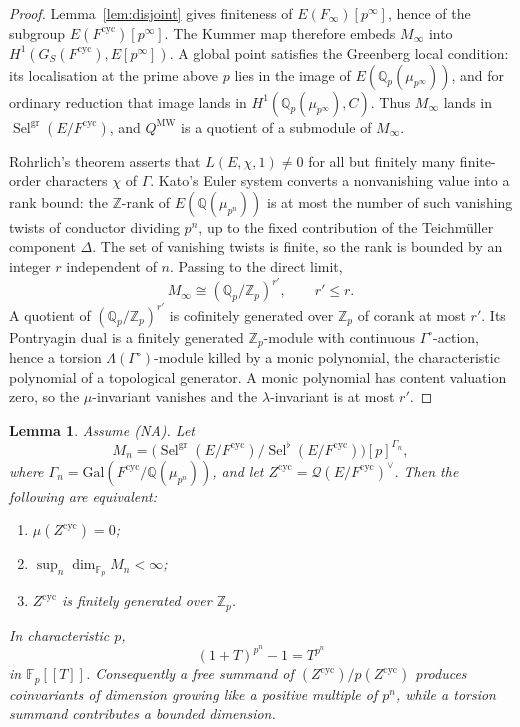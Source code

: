 \documentclass[11pt]{article}
\newtheorem{lemma}[theorem]{Lemma}
\theoremstyle{definition}
\theoremstyle{remark}
\newcommand{\Z}{\mathbb{Z}}
\newcommand{\Q}{\mathbb{Q}}
\newcommand{\F}{\mathbb{F}}
\newcommand{\Gal}{\mathrm{Gal}}
\newcommand{\Sel}{\operatorname{Sel}}
\newcommand{\cyc}{\mathrm{cyc}}
\newcommand{\gr}{\mathrm{gr}}
\newcommand{\flatp}{\flat}
\newcommand{\cQ}{\mathcal{Q}}
\newcommand{\Lam}{\Lambda}
\newcommand{\Gam}{\Gamma^{\circ}}
\begin{document}
\begin{proof}
Lemma~\ref{lem:disjoint} gives finiteness of \(E(F_\infty)[p^\infty]\), hence of the subgroup \(E(F^{\cyc})[p^\infty]\). The Kummer map therefore embeds \(M_\infty\) into \(H^1(G_S(F^{\cyc}),E[p^\infty])\). A global point satisfies the Greenberg local condition: its localisation at the prime above \(p\) lies in the image of \(E(\Q_p(\mu_{p^\infty}))\), and for ordinary reduction that image lands in \(H^1(\Q_p(\mu_{p^\infty}),C)\). Thus \(M_\infty\) lands in \(\Sel^{\gr}(E/F^{\cyc})\), and \(Q^{\mathrm{MW}}\) is a quotient of a submodule of \(M_\infty\).

Rohrlich's theorem asserts that \(L(E,\chi,1)\neq 0\) for all but finitely many finite-order characters \(\chi\) of \(\Gamma\). Kato's Euler system converts a nonvanishing value into a rank bound: the \(\Z\)-rank of \(E(\Q(\mu_{p^n}))\) is at most the number of such vanishing twists of conductor dividing \(p^n\), up to the fixed contribution of the Teichm\"uller component \(\Delta\). The set of vanishing twists is finite, so the rank is bounded by an integer \(r\) independent of \(n\). Passing to the direct limit,
\[
M_\infty\cong(\Q_p/\Z_p)^{r'},\qquad r'\le r.
\]
A quotient of \((\Q_p/\Z_p)^{r'}\) is cofinitely generated over \(\Z_p\) of corank at most \(r'\). Its Pontryagin dual is a finitely generated \(\Z_p\)-module with continuous \(\Gam\)-action, hence a torsion \(\Lam(\Gam)\)-module killed by a monic polynomial, the characteristic polynomial of a topological generator. A monic polynomial has content valuation zero, so the \(\mu\)-invariant vanishes and the \(\lambda\)-invariant is at most \(r'\).
\end{proof}

\begin{lemma}
\label{lem:residualgrowth}
Assume \textup{(NA)}. Let
\[
M_n
=
\bigl(\Sel^{\gr}(E/F^{\cyc})/\Sel^{\flatp}(E/F^{\cyc})\bigr)[p]^{\Gamma_n},
\]
where \(\Gamma_n=\Gal(F^{\cyc}/\Q(\mu_{p^n}))\), and let \(Z^{\cyc}=\cQ(E/F^{\cyc})^\vee\). Then the following are equivalent:
\begin{enumerate}[label=\textup{(\roman*)}]
\item \(\mu(Z^{\cyc})=0\);
\item \(\sup_n\dim_{\F_p} M_n<\infty\);
\item \(Z^{\cyc}\) is finitely generated over \(\Z_p\).
\end{enumerate}
In characteristic \(p\),
\begin{equation}
\label{eq:freshman}
(1+T)^{p^n}-1=T^{p^n}
\end{equation}
in \(\F_p[[T]]\). Consequently a free summand of \((Z^{\cyc})/p(Z^{\cyc})\) produces coinvariants of dimension growing like a positive multiple of \(p^n\), while a torsion summand contributes a bounded dimension.
\end{lemma}
\end{document}
